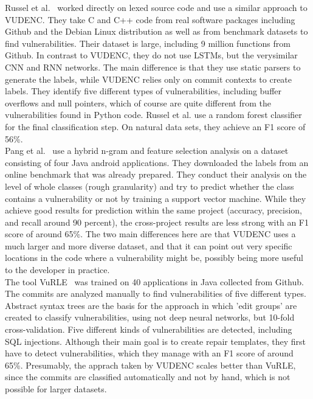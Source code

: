 \documentclass[
a4paper,
pagesize,
pdftex,
12pt,
twoside, %
BCOR=5mm, %
ngerman,
fleqn,
final,
]{scrartcl}
\begin{document}
	Russel et al.~\cite{Russell.2018} worked directly on lexed source code and use a similar approach to VUDENC. They take C and C++ code from real software packages including Github and the Debian Linux distribution as well as from benchmark datasets to find vulnerabilities. Their dataset is large, including 9 million functions from Github. In contrast to VUDENC, they do not use LSTMs, but the verysimilar CNN and RNN networks. The main difference is that they use static parsers to generate the labels, while  VUDENC relies only on commit contexts to create labels. They identify five different types of vulnerabilities, including buffer overflows and null pointers, which of course are quite different from the vulnerabilities found in Python code. Russel et al. use a random forest classifier for the final classification step. On natural data sets, they achieve an F1 score of 56\%.\\
	Pang et al.~\cite{Pang.2015} use a hybrid n-gram and feature selection analysis on a dataset consisting of four Java android applications. They downloaded the labels from an online benchmark that was already prepared. They conduct their analysis on the level of whole classes (rough granularity) and try to predict whether the class contains a vulnerability or not by training a support vector machine. While they achieve good results for prediction within the same project (accuracy, precision, and recall around 90 percent), the cross-project results are less strong with an F1 score of around 65\%. The two main differences here are that VUDENC uses a much larger and more diverse dataset, and that it can point out very specific locations in the code where a vulnerability might be, possibly being more useful to the developer in practice.\\
	The tool VuRLE~\cite{Ma.2017} was trained on 40 applications in Java collected from Github. The commits are analyzed manually to find vulnerabilities of five different types. Abstract syntax trees are the basis for the approach in which 'edit groups' are created to classify vulnerabilities, using not deep neural networks, but 10-fold cross-validation. Five different kinds of vulnerabilities are detected, including SQL injections. Although their main goal is to create repair templates, they first have to detect vulnerabilities, which they manage with an F1 score of around 65\%. Presumably, the apprach taken by VUDENC scales better than VuRLE, since the commits are classified automatically and not by hand, which is not possible for larger datasets.\\ 
\end{document}
